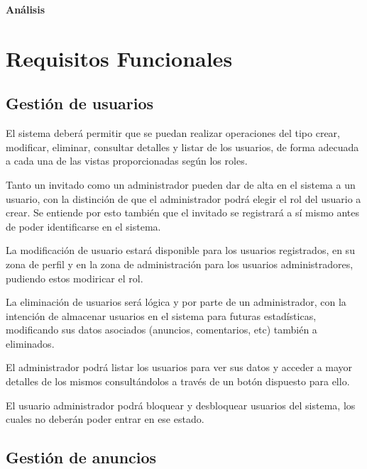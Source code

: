 \clearpage\null\newpage
\clearpage\null\newpage
\vspace*{\fill}
    \begin{center}
      \thispagestyle{empty} \vspace*{0cm} \textbf{\huge
An\'{a}lisis}
    \end{center}
    \vspace*{\fill}
\newpage{\pagestyle{empty}\cleardoublepage}

\cleardoublepage

\chapter{Requisitos Funcionales}

\section{Gesti\'{o}n de usuarios}

El sistema deber\'{a} permitir que se puedan realizar operaciones del tipo crear, modificar, eliminar, consultar detalles y listar de los usuarios, de forma adecuada a cada una de las vistas proporcionadas seg\'{u}n los roles.

Tanto un invitado como un administrador pueden dar de alta en el sistema a un usuario, con la distinci\'{o}n de que el administrador podr\'{a} elegir el rol del usuario a crear. Se entiende por esto tambi\'{e}n que el invitado se registrar\'{a} a s\'{i} mismo antes de poder identificarse en el sistema.

La modificaci\'{o}n de usuario estar\'{a} disponible para los usuarios registrados, en su zona de perfil y en la zona de administraci\'{o}n para los usuarios administradores, pudiendo estos modiricar el rol.

La eliminaci\'{o}n de usuarios ser\'{a} l\'{o}gica y por parte de un administrador, con la intenci\'{o}n de almacenar usuarios en el sistema para futuras estad\'{i}sticas, modificando sus datos asociados (anuncios, comentarios, etc) tambi\'{e}n a eliminados.

El administrador podr\'{a} listar los usuarios para ver sus datos y acceder a mayor detalles de los mismos consult\'{a}ndolos a trav\'{e}s de un bot\'{o}n dispuesto para ello.

El usuario administrador podr\'{a} bloquear y desbloquear usuarios del sistema, los cuales no deber\'{a}n poder entrar en ese estado.

\section{Gesti\'{o}n de anuncios}

